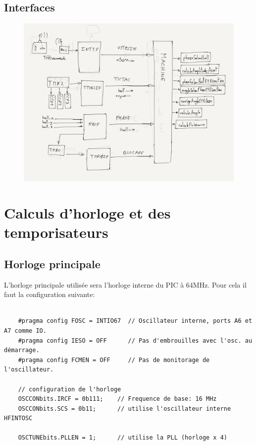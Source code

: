 \documentclass[fleqn, 11pt, a4paper]{article}
\begin{document}
  \subsection{Interfaces}
  \begin{figure}[H]
  \includegraphics[width=12cm]{main_view_interfaces}
  \centering
  \end{figure}

\section{Calculs d'horloge et des temporisateurs}
  \subsection{Horloge principale}
  L'horloge principale utilisée sera l'horloge interne du PIC à 64MHz.
  Pour cela il faut la configuration suivante:
  \begin{lstlisting}

    #pragma config FOSC = INTIO67  // Oscillateur interne, ports A6 et A7 comme IO.
    #pragma config IESO = OFF      // Pas d'embrouilles avec l'osc. au démarrage.
    #pragma config FCMEN = OFF     // Pas de monitorage de l'oscillateur.

    // configuration de l'horloge
    OSCCONbits.IRCF = 0b111;    // Frequence de base: 16 MHz
    OSCCONbits.SCS = 0b11;      // utilise l'oscillateur interne HFINTOSC
    
    OSCTUNEbits.PLLEN = 1;      // utilise la PLL (horloge x 4)    
  
  \end{lstlisting}
  
\end{document}
